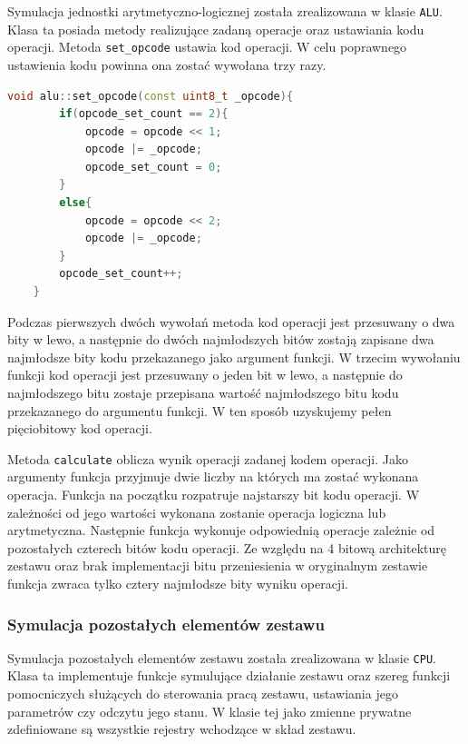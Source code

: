 \documentclass[../main.tex]{subfiles}
\begin{document}
Symulacja jednostki arytmetyczno-logicznej została zrealizowana w klasie \texttt{ALU}.
Klasa ta posiada metody realizujące zadaną operacje oraz ustawiania kodu operacji. Metoda \texttt{set\_opcode} ustawia kod operacji.
W celu poprawnego ustawienia kodu powinna ona zostać wywołana trzy razy.

\begin{lstlisting}[language=C++]
    void alu::set_opcode(const uint8_t _opcode){
        if(opcode_set_count == 2){
            opcode = opcode << 1;
            opcode |= _opcode;
            opcode_set_count = 0;
        }
        else{
            opcode = opcode << 2;
            opcode |= _opcode;
        }
        opcode_set_count++;
    }
\end{lstlisting}

Podczas pierwszych dwóch wywołań metoda kod operacji jest przesuwany o dwa bity w lewo, a następnie do dwóch najmłodszych bitów zostają
zapisane dwa najmłodsze bity kodu przekazanego jako argument funkcji. W trzecim wywołaniu funkcji kod operacji jest przesuwany o jeden bit w lewo,
a następnie do najmłodszego bitu zostaje przepisana wartość najmłodszego bitu kodu przekazanego do argumentu funkcji. W ten sposób uzyskujemy
pełen pięciobitowy kod operacji. 
\par
Metoda \texttt{calculate} oblicza wynik operacji zadanej kodem operacji. Jako argumenty funkcja przyjmuje dwie liczby na których ma zostać wykonana
operacja. Funkcja na początku rozpatruje najstarszy bit kodu operacji. W zależności od jego wartości wykonana zostanie operacja logiczna lub arytmetyczna.
Następnie funkcja wykonuje odpowiednią operacje zależnie od pozostałych czterech bitów kodu operacji. Ze względu na 4 bitową architekturę zestawu oraz
brak implementacji bitu przeniesienia w oryginalnym zestawie funkcja zwraca tylko cztery najmłodsze bity wyniku operacji. 

\subsubsection{Symulacja pozostałych elementów zestawu}

Symulacja pozostałych elementów zestawu została zrealizowana w klasie \texttt{CPU}. Klasa ta implementuje funkcje symulujące działanie zestawu oraz
szereg funkcji pomocniczych służących do sterowania pracą zestawu, ustawiania jego parametrów czy odczytu jego stanu.
W klasie tej jako zmienne prywatne zdefiniowane są wszystkie rejestry wchodzące w skład zestawu.
\end{document}
